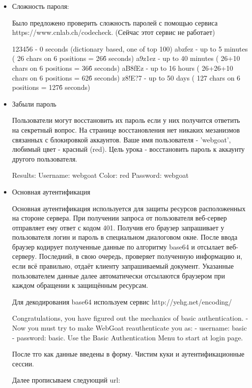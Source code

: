 \documentclass[11pt, a4paper]{article}		%
\begin{document}
\begin{itemize}

\item Сложность пароля:

Было предложено проверить сложность паролей с помощью сервиса  https://www.cnlab.ch/codecheck. (Сейчас этот сервис не работает)

    123456 - 0 seconds (dictionary based, one of top 100)
    abzfez - up to 5 minutes ( 26 chars on 6 positions = 26\^6 seconds)
    a9z1ez - up to 40 minutes ( 26+10 chars on 6 positions = 36\^6 seconds)
    aB8fEz - up to 16 hours ( 26+26+10 chars on 6 positions = 62\^6 seconds)
    z8!E?7 - up to 50 days ( 127 chars on 6 positions = 127\^6 seconds)

\item Забыли пароль

Пользователи могут восстановить их пароль если у них получится ответить на секретный вопрос. На странице
восстановления нет никаких мезанизмов связанных с блокировкой аккаунтов. Ваше имя пользователя - 'webgoat',
любимый цвет - красный (red). Цель урока - восстановить пароль к аккаунту другого пользователя.

Results:
Username: webgoat
Color: red
Password: webgoat

\item Основная аутентификация

Основная аутентификация используется для защиты ресурсов расположенных на стороне сервера.
При получении запроса от пользователя веб-сервер отправляет ему ответ с кодом 401.
Получив его браузер запрашивает у пользователя логин и пароль в специальном диалоговом окне. После
ввода браузер кодирует полученные данные по алгоритму base64 и отсылает веб-серверу.
Последний, в свою очередь, проверяет полученную информацию и, если всё правильно, отдаёт клиенту запрашиваемый
документ. Указанные пользователем данные далее автоматически отсылаются браузером при каждом обращении к
защищённым ресурсам.

Для декодирования base64 используем сервис http://yehg.net/encoding/

Congratulations, you have figured out the mechanics of basic authentication.  
- Now you must try to make WebGoat reauthenticate you as:
- username: basic     
- password: basic. 
Use the Basic Authentication Menu to start at login page.
 
После тго как данные введены в форму. Чистим куки и аутентификационные сессии.

Далее прописываем следующий url: 


\end{itemize}
\end{document}
